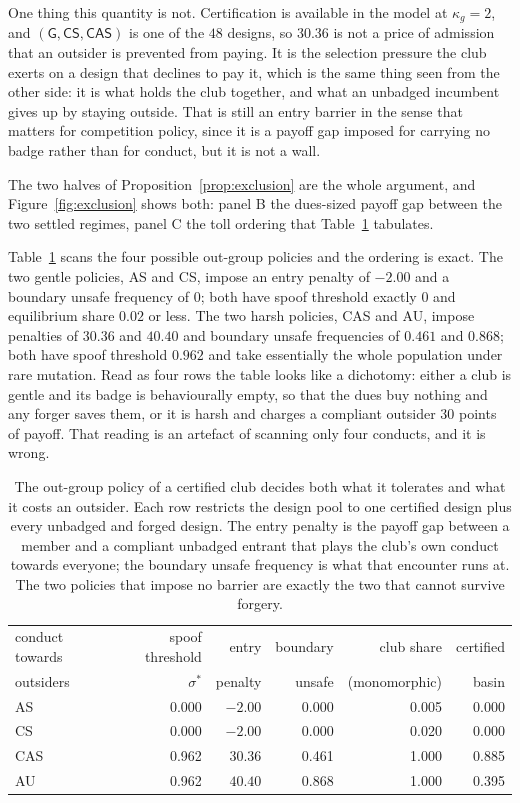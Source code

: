 \documentclass[preprint,12pt]{elsarticle}
\theoremstyle{plain}
\theoremstyle{definition}
\newcommand{\AS}{\textsf{AS}}
\newcommand{\CS}{\textsf{CS}}
\newcommand{\CAS}{\textsf{CAS}}
\newcommand{\AU}{\textsf{AU}}
\begin{document}
One thing this quantity is not. Certification is available in the model at
$\kappa_g = 2$, and $(\mathsf{G}, \CS, \CAS)$ is one of the $48$ designs, so
$30.36$ is not a price of admission that an outsider is prevented from paying.
It is the selection pressure the club exerts on a design that declines to pay
it, which is the same thing seen from the other side: it is what holds the club
together, and what an unbadged incumbent gives up by staying outside. That is
still an entry barrier in the sense that matters for competition policy, since
it is a payoff gap imposed for carrying no badge rather than for conduct, but
it is not a wall.

The two halves of Proposition~\ref{prop:exclusion} are the whole argument,
and Figure~\ref{fig:exclusion} shows both: panel B the dues-sized payoff gap
between the two settled regimes, panel C the toll ordering that
Table~\ref{tab:outgroup} tabulates.

Table~\ref{tab:outgroup} scans the four possible out-group policies and the
ordering is exact. The two gentle policies, \AS{} and \CS{}, impose an entry
penalty of $-2.00$ and a boundary unsafe frequency of $0$; both have spoof
threshold exactly $0$ and equilibrium share $0.02$ or less. The two harsh
policies, \CAS{} and \AU{}, impose penalties of $30.36$ and $40.40$ and
boundary unsafe frequencies of $0.461$ and $0.868$; both have spoof threshold
$0.962$ and take essentially the whole population under rare mutation. Read as
four rows the table looks like a dichotomy: either a club is gentle and its
badge is behaviourally empty, so that the dues buy nothing and any forger saves
them, or it is harsh and charges a compliant outsider $30$ points of payoff.
That reading is an artefact of scanning only four conducts, and it is wrong.

\begin{table}[t]
\centering
\caption{The out-group policy of a certified club decides both what it
tolerates and what it costs an outsider. Each row restricts the design pool to
one certified design plus every unbadged and forged design. The entry penalty
is the payoff gap between a member and a compliant unbadged entrant that plays
the club's own conduct towards everyone; the boundary unsafe frequency is what
that encounter runs at. The two policies that impose no barrier are exactly the
two that cannot survive forgery.}
\label{tab:outgroup}
\footnotesize
\setlength{\tabcolsep}{4pt}
\begin{tabular}{lrrrrr}
\toprule
conduct towards & spoof threshold & entry & boundary & club share & certified \\
outsiders & $\sigma^{*}$ & penalty & unsafe & (monomorphic) & basin \\
\midrule
\AS{}  & 0.000 & $-2.00$ & 0.000 & 0.005 & 0.000 \\
\CS{}  & 0.000 & $-2.00$ & 0.000 & 0.020 & 0.000 \\
\CAS{} & 0.962 & $30.36$ & 0.461 & 1.000 & 0.885 \\
\AU{}  & 0.962 & $40.40$ & 0.868 & 1.000 & 0.395 \\
\bottomrule
\end{tabular}
\end{table}
\end{document}
